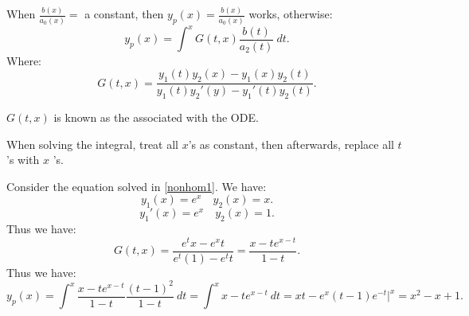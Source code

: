 \documentclass[../main/main.tex]{subfiles}
\begin{document}
When $\frac{b(x)}{a_0(x)}=$ a  constant, then $y_p(x)=\frac{b(x)}{a_0(x)}$ works, otherwise: \[
	y_p(x) = \int^x G(t,x) \frac{b(t)}{a_2(t)}~dt
.\] Where: \[
G(t,x) = \frac{y_1(t)y_2(x)-y_1(x)y_2(t)}{y_1(t)y_2'(y)-y_1'(t)y_2(t)}
.\] 
\begin{remark}
	$G(t,x)$ is known as the  associated with the ODE.
\end{remark}
\begin{remark}
	When solving the integral, treat all $x$'s as constant, then afterwards, replace all $t$ 's with $x$ 's.
\end{remark}
\begin{example}
	Consider the equation solved in \ref{nonhom1}. We have: \[
		y_1(x)=e^{x}\quad y_2(x) = x
	.\] 	\[
	y_1'(x) = e^{x} \quad y_2(x)= 1
	.\] Thus we have: \[
	G(t,x) = \frac{e^{t}x-e^{x}t}{e^{t}(1)-e^{t}t} = \frac{x-te^{x-t}}{1-t}
	.\] Thus we have: \[
	y_p(x) = \int^x \frac{x-t e^{x-t}}{1-t} \frac{(t-1)^2}{1-t}~dt = \int^x x-t e^{x-t}~dt = xt -e^{x}(t-1)e^{-t}\bigg\rvert^x = x^2-x+1
	.\] 
\end{example}
\end{document}
